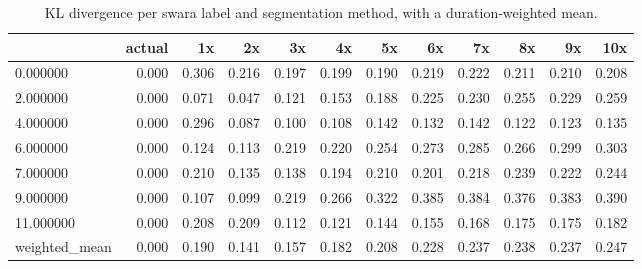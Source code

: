 \begin{table}
\caption{KL divergence per swara label and segmentation method, with a duration-weighted mean.}
\label{tab:kl_divergence_weighted}
\begin{tabular}{lrrrrrrrrrrr}
\toprule
 & actual & 1x & 2x & 3x & 4x & 5x & 6x & 7x & 8x & 9x & 10x \\
\midrule
0.000000 & 0.000 & 0.306 & 0.216 & 0.197 & 0.199 & 0.190 & 0.219 & 0.222 & 0.211 & 0.210 & 0.208 \\
2.000000 & 0.000 & 0.071 & 0.047 & 0.121 & 0.153 & 0.188 & 0.225 & 0.230 & 0.255 & 0.229 & 0.259 \\
4.000000 & 0.000 & 0.296 & 0.087 & 0.100 & 0.108 & 0.142 & 0.132 & 0.142 & 0.122 & 0.123 & 0.135 \\
6.000000 & 0.000 & 0.124 & 0.113 & 0.219 & 0.220 & 0.254 & 0.273 & 0.285 & 0.266 & 0.299 & 0.303 \\
7.000000 & 0.000 & 0.210 & 0.135 & 0.138 & 0.194 & 0.210 & 0.201 & 0.218 & 0.239 & 0.222 & 0.244 \\
9.000000 & 0.000 & 0.107 & 0.099 & 0.219 & 0.266 & 0.322 & 0.385 & 0.384 & 0.376 & 0.383 & 0.390 \\
11.000000 & 0.000 & 0.208 & 0.209 & 0.112 & 0.121 & 0.144 & 0.155 & 0.168 & 0.175 & 0.175 & 0.182 \\
weighted_mean & 0.000 & 0.190 & 0.141 & 0.157 & 0.182 & 0.208 & 0.228 & 0.237 & 0.238 & 0.237 & 0.247 \\
\bottomrule
\end{tabular}
\end{table}
